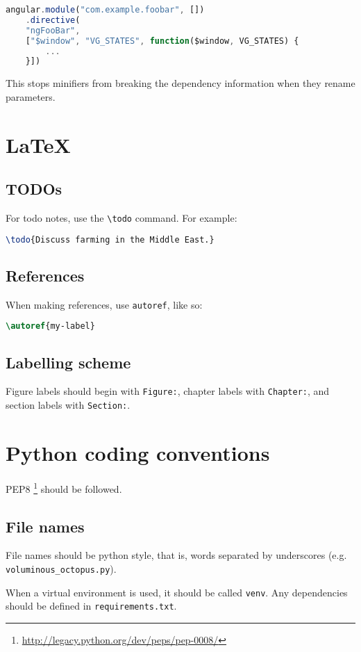 \begin{lstlisting}[language=javascript]
angular.module("com.example.foobar", [])
    .directive(
    "ngFooBar",
    ["$window", "VG_STATES", function($window, VG_STATES) {
        ...
    }])
\end{lstlisting}

This stops minifiers from breaking the dependency information when they
rename parameters.

\section{LaTeX}

\subsection{TODOs}

For todo notes, use the \texttt{\textbackslash{}todo} command. For
example:

\begin{lstlisting}[language=tex]
\todo{Discuss farming in the Middle East.}
\end{lstlisting}

\subsection{References}

When making references, use \texttt{autoref}, like so:

\begin{lstlisting}[language=tex]
\autoref{my-label}
\end{lstlisting}

\subsection{Labelling scheme}

Figure labels should begin with \texttt{Figure:}, chapter labels with
\texttt{Chapter:}, and section labels with \texttt{Section:}.

\section{Python coding conventions}

PEP8 \footnote{\url{http://legacy.python.org/dev/peps/pep-0008/}} should be
followed.

\subsection{File names}

File names should be python style, that is, words separated by
underscores (e.g. \texttt{voluminous\_octopus.py}).

When a virtual environment is used, it should be called \texttt{venv}.
Any dependencies should be defined in \texttt{requirements.txt}.

